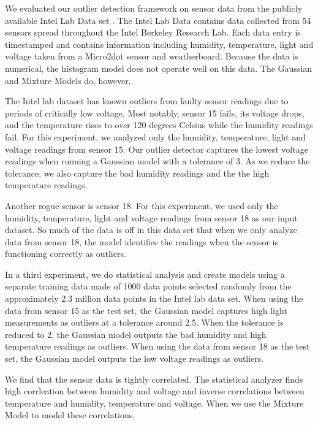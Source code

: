 
We evaluated our outlier detection framework on sensor data from the publicly available Intel Lab Data set \cite{IntelLabData}.
The Intel Lab Data contains data collected from 54 sensors spread throughout the Intel Berkeley Research Lab.
Each data entry is timestamped and contains information including humidity, temperature, light and voltage taken from a Micro2dot sensor and weatherboard.
Because the data is numerical, the histogram model does not operate well on this data.
The Gaussian and Mixture Models do, however.

The Intel lab dataset has known outliers from faulty sensor readings due to periods of critically low voltage.
Most notably, sensor 15 fails, its voltage drops, and the temperature rises to over 120 degrees Celsius while the humidity readings fail. 
For this experiment, we analyzed only the humidity, temperature, light and voltage readings from sensor 15.  
Our outlier detector captures the lowest voltage readings when running a Gaussian model with a tolerance of 3.
As we reduce the tolerance, we also capture the bad humidity readings and the the high temperature readings.

Another rogue sensor is sensor 18.
For this experiment, we used only the humidity, temperature, light and voltage readings from sensor 18 as our input dataset.
So much of the data is off in this data set that when we only analyze data from sensor 18, the model identifies the readings when the sensor is functioning correctly as outliers.

In a third experiment, we do statistical analysis and create models using a separate training data made of 1000 data points selected randomly from the approximately 2.3 million data points in the Intel lab data set.
When using the data from sensor 15 as the test set, the Gaussian model captures high light measurements as outliers at a tolerance around 2.5.
When the tolerance is reduced to 2, the Gaussian model outputs the bad humidity and high temperature readings as outliers.
When using the data from sensor 18 as the test set, the Gaussian model outputs the low voltage readings as outliers.

We find that the sensor data is tightly correlated.
The statistical analyzer finds high corrleation between humidity and voltage and inverse correlations between temperature and humidity, temperature and voltage.
When we use the Mixture Model to model these correlations, 
